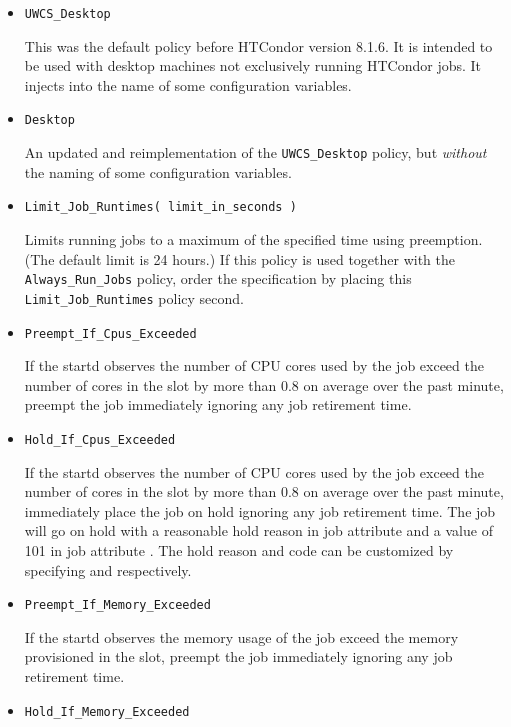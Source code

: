 \begin{description}
\begin{itemize}
    \item \texttt{UWCS\_Desktop}

    This was the default policy before HTCondor version 8.1.6.
    It is intended to be used with desktop machines not exclusively running
    HTCondor jobs.
    It injects  into the name of some configuration variables.

    \item \texttt{Desktop}

    An updated and reimplementation of the \texttt{UWCS\_Desktop} policy,
    but \emph{without} the  naming of some configuration variables.

    \item \texttt{Limit\_Job\_Runtimes( limit\_in\_seconds )}

    Limits running jobs to a maximum of the specified time using preemption.
	(The default limit is 24 hours.)
    If this policy is used together with the \texttt{Always\_Run\_Jobs} policy,
    order the specification by placing this \texttt{Limit\_Job\_Runtimes} 
    policy second. 

	\item \texttt{Preempt\_If\_Cpus\_Exceeded}

	If the startd observes the number of CPU cores used by the job exceed
	the number of cores in the slot by more than 0.8 on average over the past
	minute, preempt the job immediately
	ignoring any job retirement time.

	\item \texttt{Hold\_If\_Cpus\_Exceeded}

	If the startd observes the number of CPU cores used by the job exceed
	the number of cores in the slot by more than 0.8 on average over the past
	minute, immediately place the job on hold
	ignoring any job retirement time.  The job will go on hold with a reasonable
	hold reason in job attribute  and a value of 101 in job
	attribute .  The hold reason and code can be customized by
	specifying  and
	 respectively.

	\item \texttt{Preempt\_If\_Memory\_Exceeded}

	If the startd observes the memory usage of the job exceed
	the memory provisioned in the slot, preempt the job immediately
	ignoring any job retirement time.

	\item \texttt{Hold\_If\_Memory\_Exceeded}


\end{itemize}
\end{description}
